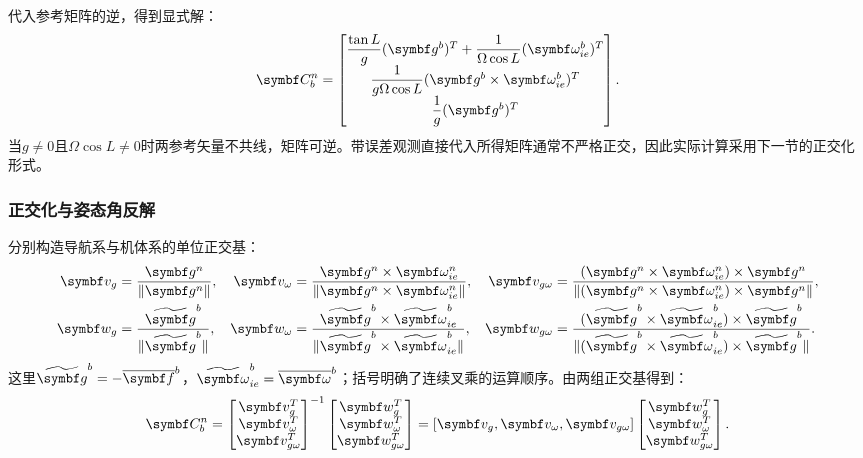 代入参考矩阵的逆，得到显式解：
\begin{equation}
\matr C_b^n=
\begin{bmatrix}
\dfrac{\tan L}{g}(\matr g^b)^T+\dfrac{1}{\Omega\cos L}(\matr\omega_{ie}^b)^T\\[4pt]
\dfrac{1}{g\Omega\cos L}(\matr g^b\times\matr\omega_{ie}^b)^T\\[4pt]
\dfrac{1}{g}(\matr g^b)^T
\end{bmatrix}.
\label{eq:directexplicit}\end{equation}
当$g\ne0$且$\Omega\cos L\ne0$时两参考矢量不共线，矩阵可逆。带误差观测直接代入所得矩阵通常不严格正交，因此实际计算采用下一节的正交化形式。

\subsubsection{正交化与姿态角反解}
分别构造导航系与机体系的单位正交基：
\begin{equation}
\begin{aligned}
\matr v_g&=\frac{\matr g^n}{\|\matr g^n\|},&
\matr v_\omega&=\frac{\matr g^n\times\matr\omega_{ie}^n}{\|\matr g^n\times\matr\omega_{ie}^n\|},&
\matr v_{g\omega}&=\frac{(\matr g^n\times\matr\omega_{ie}^n)\times\matr g^n}{\|(\matr g^n\times\matr\omega_{ie}^n)\times\matr g^n\|},\\
\matr w_g&=\frac{\widetilde{\matr g}^b}{\|\widetilde{\matr g}^b\|},&
\matr w_\omega&=\frac{\widetilde{\matr g}^b\times\widetilde{\matr\omega}_{ie}^b}{\|\widetilde{\matr g}^b\times\widetilde{\matr\omega}_{ie}^b\|},&
\matr w_{g\omega}&=\frac{(\widetilde{\matr g}^b\times\widetilde{\matr\omega}_{ie}^b)\times\widetilde{\matr g}^b}{\|(\widetilde{\matr g}^b\times\widetilde{\matr\omega}_{ie}^b)\times\widetilde{\matr g}^b\|}.
\end{aligned}
\label{eq:bothbases}\end{equation}
这里$\widetilde{\matr g}^b=-\overline{\matr f}^b$，$\widetilde{\matr\omega}_{ie}^b=\overline{\matr\omega}^b$；括号明确了连续叉乘的运算顺序。由两组正交基得到：
\begin{equation}
\matr C_b^n=
\begin{bmatrix}\matr v_g^T\\\matr v_\omega^T\\\matr v_{g\omega}^T\end{bmatrix}^{-1}
\begin{bmatrix}\matr w_g^T\\\matr w_\omega^T\\\matr w_{g\omega}^T\end{bmatrix}
=[\matr v_g,\matr v_\omega,\matr v_{g\omega}]
\begin{bmatrix}\matr w_g^T\\\matr w_\omega^T\\\matr w_{g\omega}^T\end{bmatrix}.
\label{eq:orthotriad}\end{equation}
